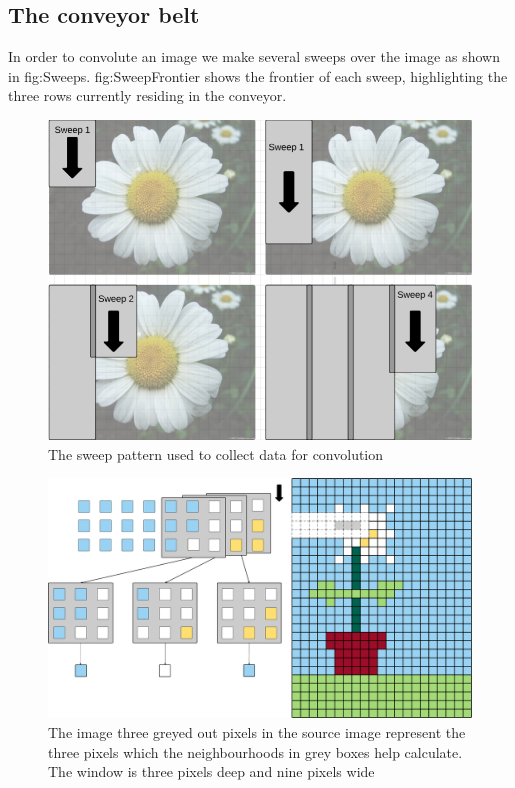 \subsection{The conveyor belt}
In order to convolute an image we make several sweeps over the image as shown in fig:Sweeps. 
fig:SweepFrontier shows the frontier of each sweep, highlighting the three rows currently residing in the conveyor.
\begin{figure}[h!]
    \includegraphics[width=\linewidth]{img/Sweeps.png}
    \caption{The sweep pattern used to collect data for convolution}
    \label{fig:Sweeps}
\end{figure}
\begin{figure}[h!]
    \includegraphics[width=\linewidth]{img/FeedPattern.png}
    \caption{The image three greyed out pixels in the source image represent the three pixels which the neighbourhoods in grey boxes help calculate. The window is three pixels deep and nine pixels wide}
    \label{fig:SweepFrontier}
\end{figure}
